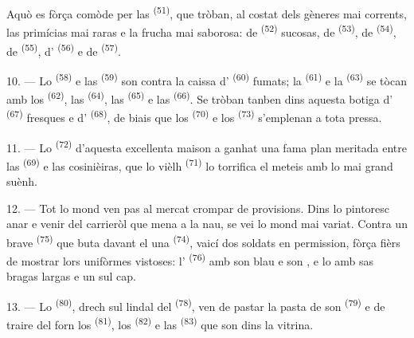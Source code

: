 Aquò es fòrça comòde per las  \textsuperscript{(51)}, que
tròban, al costat dels gèneres mai corrents, las primícias mai raras e la frucha
mai saborosa: de  \textsuperscript{(52)} sucosas, de
 \textsuperscript{(53)}, de 
\textsuperscript{(54)}, de  \textsuperscript{(55)},
d' \textsuperscript{(56)} e de 
\textsuperscript{(57)}.

\VUsaut{4.0mm}
\VUsaut{3.0mm}

10. --- Lo  \textsuperscript{(58)} e las 
\textsuperscript{(59)} son contra la caissa d'
\textsuperscript{(60)} fumats; la  \textsuperscript{(61)} e la
 \textsuperscript{(63)} se tòcan amb los 
\textsuperscript{(62)}, las  \textsuperscript{(64)}, las
 \textsuperscript{(65)} e las 
\textsuperscript{(66)}. Se tròban tanben dins aquesta botiga d'
\textsuperscript{(67)} fresques e d' \textsuperscript{(68)}, de
biais que los  \textsuperscript{(70)} e los  \textsuperscript{(73)} s'emplenan a tota pressa.

11. --- Lo  \textsuperscript{(72)} d'aquesta excellenta maison a
ganhat una fama plan meritada entre las 
\textsuperscript{(69)} e las cosinièiras, que lo vièlh 
\textsuperscript{(71)} lo torrifica el meteis amb lo mai grand suènh.

\VUsaut{4.0mm}
\VUsaut{3.0mm}

12. --- Tot lo mond ven pas al mercat crompar de provisions. Dins lo pintoresc anar
e venir del carrieròl que mena a la nau, se vei lo mond mai variat. Contra un
brave  \textsuperscript{(75)} que buta davant el una 
\textsuperscript{(74)}, vaicí dos soldats en permission, fòrça fièrs de mostrar
lors unifòrmes vistoses: l' \textsuperscript{(76)} amb son
 blau e son , e lo 
amb sas bragas largas e un  sul cap.

13. --- Lo  \textsuperscript{(80)}, drech sul lindal del
 \textsuperscript{(78)}, ven de pastar la pasta de son 
\textsuperscript{(79)} e de traire del forn los 
\textsuperscript{(81)}, los  \textsuperscript{(82)} e las
 \textsuperscript{(83)} que son dins la vitrina.

